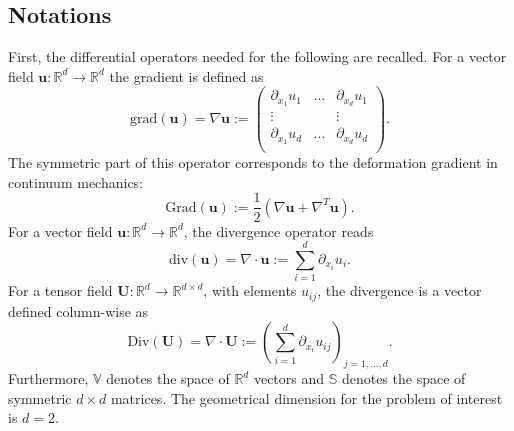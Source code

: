 \documentclass{ifacconf}
\begin{document}
\subsection{Notations}
 First, the differential operators needed for the following are recalled. For a vector field $\bm{u}: \mathbb{R}^d \rightarrow \mathbb{R}^d$ the gradient is defined as 
\begin{equation*}
	\mathrm{grad}(\bm{u}) =  \nabla \bm{u} := \begin{pmatrix}
	\partial_{x_1} u_1 & \dots & \partial_{x_d} u_1 \\
	\vdots & & \vdots \\
	\partial_{x_1} u_d & \dots & \partial_{x_d} u_d \\
	\end{pmatrix}.
\end{equation*}
The symmetric part of this operator corresponds to the deformation gradient in continuum mechanics:
\begin{equation*}
\mathrm{Grad}(\bm{u}) := \frac{1}{2} \left(\nabla \bm{u} + \nabla^T \bm{u} \right).
\end{equation*}
For a vector field  $\bm{u}: \mathbb{R}^d \rightarrow \mathbb{R}^{d}$, the divergence operator reads
\begin{equation*}
\mathrm{div}(\bm u) = \nabla \cdot \bm{u} := \sum_{i = 1}^d \partial_{x_i} u_{i}.
\end{equation*}
For a tensor field $\bm{U}: \mathbb{R}^d \rightarrow \mathbb{R}^{d \times d}$, with elements $u_{ij}$, the divergence is a vector defined column-wise as
\begin{equation*}
	\mathrm{Div}(\bm U) = \nabla \cdot \bm{U} := \left( \sum_{i = 1}^d \partial_{x_i} u_{ij} \right)_{j = 1, \dots, d}.
\end{equation*}
Furthermore, $\mathbb{V}$ denotes the space of $\mathbb{R}^d$ vectors and $\mathbb{S}$ denotes the space of
symmetric $d \times d$ matrices. The geometrical dimension for the problem of interest is $d=2$.
\end{document}
